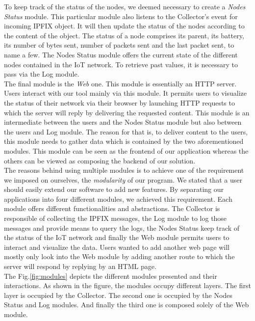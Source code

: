 To keep track of the status of the nodes, we deemed necessary to create a \textit{Nodes Status} module. This particular module also listens to the Collector's event for incoming IPFIX object. It will then update the status of the nodes according to the content of the object. The status of a node comprises its parent, its battery, its number of bytes sent, number of packets sent and the last packet sent, to name a few. The Nodes Status module offers the current state of the different nodes contained in the IoT network. To retrieve past values, it is necessary to pass via the Log module. \\

The final module is the \textit{Web} one. This module is essentially an HTTP server. Users interact with our tool mainly via this module. It permits users to visualize the status of their network via their browser by launching HTTP requests to which the server will reply by delivering the requested content. This module is an intermediate between the users and the Nodes Status module but also between the users and Log module. The reason for that is, to deliver content to the users, this module needs to gather data which is contained by the two aforementioned modules. This module can be seen as the frontend of our application whereas the others can be viewed as composing the backend of our solution.\\

The reasons behind using multiple modules is to achieve one of the requirement we imposed on ourselves, the \textit{modularity} of our program. We stated that a user should easily extend our software to add new features. By separating our applications into four different modules, we achieved this requirement. Each module offers different functionalities and abstractions. The Collector is responsible of collecting the IPFIX messages, the Log module to log those messages and provide means to query the logs, the Nodes Status keep track of the status of the IoT network and finally the Web module permits users to interact and visualize the data. Users wanted to add another web page will mostly only look into the Web module by adding another route to which the server will respond by replying by an HTML page. \\

The Fig.\ref{fig:modules} depicts the different modules presented and their interactions. As shown in the figure, the modules occupy different layers. The first layer is occupied by the Collector. The second one is occupied by the Nodes Status and Log modules. And finally the third one is composed solely of the Web module.

